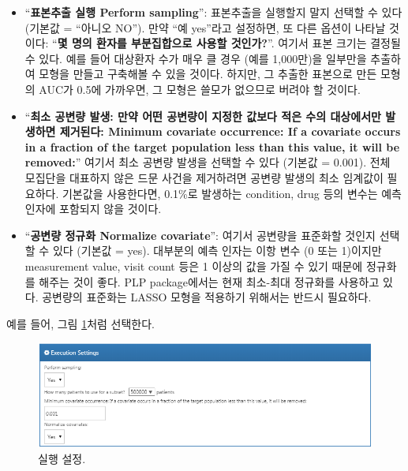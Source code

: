 \documentclass[10.5pt]{book}
\providecommand{\tightlist}{%
  \setlength{\itemsep}{0pt}\setlength{\parskip}{0pt}}
\theoremstyle{definition}
\theoremstyle{definition}
\theoremstyle{definition}
\theoremstyle{remark}
\begin{document}
\begin{itemize}
\tightlist
\item
  ``\textbf{표본추출 실행 Perform sampling}'': 표본추출을 실행할지 말지
  선택할 수 있다 (기본값 = ``아니오 NO''). 만약 ``예 yes''라고 설정하면,
  또 다른 옵션이 나타날 것이다: ``\textbf{몇 명의 환자를 부분집합으로
  사용할 것인가?}''. 여기서 표본 크기는 결정될 수 있다. 예를 들어
  대상환자 수가 매우 클 경우 (예를 1,000만)을 일부만을 추출하여 모형을
  만들고 구축해볼 수 있을 것이다. 하지만, 그 추출한 표본으로 만든 모형의
  AUC가 0.5에 가까우면, 그 모형은 쓸모가 없으므로 버려야 할 것이다.
\item
  ``\textbf{최소 공변량 발생: 만약 어떤 공변량이 지정한 값보다 적은 수의
  대상에서만 발생하면 제거된다: Minimum covariate occurrence: If a
  covariate occurs in a fraction of the target population less than this
  value, it will be removed:}'' 여기서 최소 공변량 발생을 선택할 수 있다
  (기본값 = 0.001). 전체 모집단을 대표하지 않은 드문 사건을 제거하려면
  공변량 발생의 최소 임계값이 필요하다. 기본값을 사용한다면, 0.1\%로
  발생하는 condition, drug 등의 변수는 예측 인자에 포함되지 않을 것이다.
\item
  ``\textbf{공변량 정규화 Normalize covariate}'': 여기서 공변량을
  표준화할 것인지 선택할 수 있다 (기본값 = yes). 대부분의 예측 인자는
  이항 변수 (0 또는 1)이지만 measurement value, visit count 등은 1
  이상의 값을 가질 수 있기 때문에 정규화를 해주는 것이 좋다. PLP
  package에서는 현재 최소-최대 정규화를 사용하고 있다. 공변량의 표준화는
  LASSO 모형을 적용하기 위해서는 반드시 필요하다.
\end{itemize}

예를 들어, 그림 \ref{fig:executionSettings}처럼 선택한다.

\begin{figure}

{\centering \includegraphics[width=1\linewidth]{images/PatientLevelPrediction/executionSettings} 

}

\caption{실행 설정.}\label{fig:executionSettings}
\end{figure}
\end{document}
